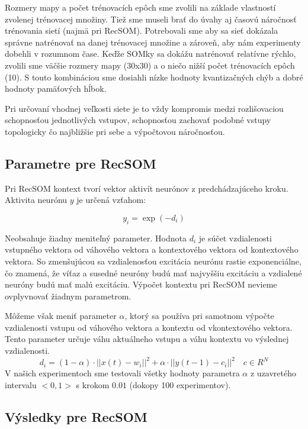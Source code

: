 Rozmery mapy a počet trénovacích epôch sme zvolili na základe vlastností zvolenej trénovacej množiny. 
Tiež sme museli brať do úvahy aj časovú náročnosť trénovania sietí (najmä pri RecSOM).
Potrebovali sme aby sa sieť dokázala správne natrénovať na danej trénovacej množine a zároveň, aby nám experimenty dobehli v rozumnom čase.
Keďže SOMky sa dokážu natrénovať relatívne rýchlo, zvolili sme väčšie rozmery mapy (30x30) a o niečo nižší počet trénovacích epôch (10).
S touto kombináciou sme dosiahli nízke hodnoty kvantizačných chýb a dobré hodnoty pamäťových hĺbok.

Pri určovaní vhodnej veľkosti siete je to vždy kompromis medzi rozlišovaciou schopnosťou jednotlivých vstupov, schopnosťou
zachovať podobné vstupy topologicky čo najbližšie pri sebe a výpočtovou náročnosťou. 


\subsection{Parametre pre RecSOM}
Pri RecSOM kontext tvorí vektor aktivít neurónov z predchádzajúceho kroku.
Aktivita neurónu $y$ je určená vzťahom:

\begin{equation}
    y_{i} = \exp{(-d_{i})}
\end{equation}

Neobsahuje žiadny meniteľný parameter. Hodnota $d_{i}$ je súčet vzdialenosti vstupného vektora od váhového vektora a kontextového vektora od 
kontextového vektora. So zmenšujúcou sa vzdialenosťou excitácia neurónu rastie exponenciálne, čo 
znamená, že víťaz a susedné neuróny budú mať najvyššiu excitáciu a vzdialené neuróny budú mať malú excitáciu.
Výpočet kontextu pri RecSOM nevieme ovplyvnovať žiadnym parametrom.

Môžeme však meniť parameter $\alpha$, ktorý sa používa pri samotnom výpočte vzdialenosti
vstupu od váhového vektora a kontextu od vkontextového vektora. Tento parameter určuje váhu aktuálneho vstupu a váhu kontextu
vo výslednej vzdialenosti.
\begin{equation}
	d_i = (1 - \alpha) \cdot ||x(t) - w_i||^{2} + \alpha \cdot ||y(t-1) - c_i||^{2} \quad c \in R^{N}
\end{equation}
V našich experimentoch sme testovali všetky hodnoty parametra $\alpha$ z uzavretého intervalu
$<0, 1>$ s krokom $0.01$ (dokopy 100 experimentov).

\subsection{Výsledky pre RecSOM}

